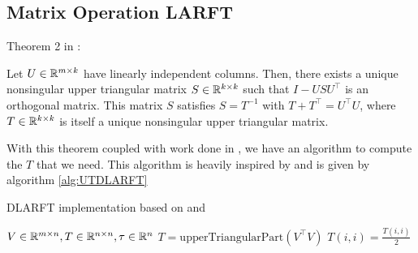 \documentclass[12pt]{article}
\begin{document}
    \subsection{Matrix Operation LARFT}
    \begin{theorem}\label{thm:Puglisi}
        Theorem 2 in \cite{Joff}:

        Let $U\in\mathbb{R}^{m\times k}$ have linearly independent columns. Then, there exists
        a unique nonsingular upper triangular matrix $S\in\mathbb{R}^{k\times k}$ such that
        $I-USU^\top$ is an orthogonal matrix. This matrix $S$ satisfies $S=T^{-1}$ with
        $T+T^\top = U^\top U$, where $T\in\mathbb{R}^{k\times k}$ is itself a unique nonsingular upper 
        triangular matrix.
    \end{theorem}
    With this theorem coupled with work done in \cite{Puglisi}, we have an algorithm to compute the $T$ that 
    we need. This algorithm is heavily inspired by \cite{Joff} and is given by algorithm \ref{alg:UTDLARFT}

    \begin{algorithm}
        \caption{DLARFT implementation based on \cite{Joff} and \cite{Puglisi}}\label{alg:UTDLARFT}
        \begin{algorithmic}[1]
            \REQUIRE $V\in\mathbb{R}^{m\times n}, T\in\mathbb{R}^{n\times n}, \tau\in\mathbb{R}^n$\hfill{}
            \STATE $T = \text{upperTriangularPart}\left(V^\top V\right)$
                \STATE $T(i,i) = \frac{T(i,i)}{2}$
            \ENDFOR
            \STATE 
        \end{algorithmic}
    \end{algorithm}
\end{document}
